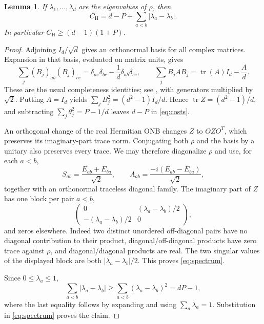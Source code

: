 \documentclass[11pt]{article}
\newcommand{\tr}{\operatorname{tr}}
\newcommand{\Id}{I}
\newcommand{\CH}{C_{\mathrm H}}
\newtheorem{lemma}[theorem]{Lemma}
\begin{document}
\begin{lemma}\label{lem:spectrum}
If $\lambda_1,\ldots,\lambda_d$ are the eigenvalues of $\rho$, then
\begin{equation}\label{eq:spectrum}
 \CH=d-P+\sum_{a<b}|\lambda_a-\lambda_b|.
\end{equation}
In particular $\CH\geq(d-1)(1+P)$.
\end{lemma}
\begin{proof}
Adjoining $\Id_d/\sqrt d$ gives an orthonormal basis for all complex
matrices. Expansion in that basis, evaluated on matrix units, gives
\begin{equation}\label{eq:fierz}
 \sum_j(B_j)_{ab}(B_j)_{ce}
 =\delta_{ae}\delta_{bc}-\frac1d\delta_{ab}\delta_{ce},\qquad
 \sum_j B_j A B_j=\tr(A)\Id_d-\frac{A}{d}.
\end{equation}
These are the usual completeness identities; see
\cite[Sec.~2]{Haber}, with generators multiplied by $\sqrt2$.
Putting $A=\Id_d$ yields $\sum_jB_j^2=(d^2-1)\Id_d/d$.
Hence $\tr Z=(d^2-1)/d$, and subtracting
$\sum_j\theta_j^2=P-1/d$ leaves $d-P$ in \eqref{eq:costs}.

An orthogonal change of the real Hermitian ONB changes $Z$ to $OZO^T$,
which preserves its imaginary-part trace norm. Conjugating both $\rho$
and the basis by a unitary also preserves every trace. We may therefore
diagonalize $\rho$ and use, for each $a<b$,
\[
 S_{ab}=\frac{E_{ab}+E_{ba}}{\sqrt2},\qquad
 A_{ab}=\frac{-i(E_{ab}-E_{ba})}{\sqrt2},
\]
together with an orthonormal traceless diagonal family.
The imaginary part of $Z$ has one block per pair $a<b$,
\[
 \begin{pmatrix}0&(\lambda_a-\lambda_b)/2\\
 -(\lambda_a-\lambda_b)/2&0\end{pmatrix},
\]
and zeros elsewhere. Indeed two distinct unordered off-diagonal pairs
have no diagonal contribution to their product, diagonal/off-diagonal
products have zero trace against $\rho$, and diagonal/diagonal products
are real. The two singular values of the displayed block are both
$|\lambda_a-\lambda_b|/2$. This proves \eqref{eq:spectrum}.

Since $0\leq\lambda_a\leq1$,
\[
 \sum_{a<b}|\lambda_a-\lambda_b|
 \geq\sum_{a<b}(\lambda_a-\lambda_b)^2=dP-1,
\]
where the last equality follows by expanding and using
$\sum_a\lambda_a=1$. Substitution in \eqref{eq:spectrum} proves the claim.
\end{proof}
\end{document}
